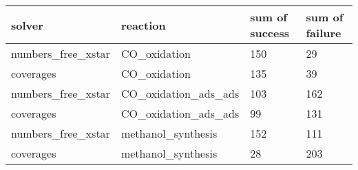 \begin{tabular}{llll}
\toprule
            solver &             reaction & sum of success & sum of failure \\
\midrule
numbers\_free\_xstar &         CO\_oxidation &            150 &             29 \\
         coverages &         CO\_oxidation &            135 &             39 \\
numbers\_free\_xstar & CO\_oxidation\_ads\_ads &            103 &            162 \\
         coverages & CO\_oxidation\_ads\_ads &             99 &            131 \\
numbers\_free\_xstar &   methanol\_synthesis &            152 &            111 \\
         coverages &   methanol\_synthesis &             28 &            203 \\
\bottomrule
\end{tabular}
